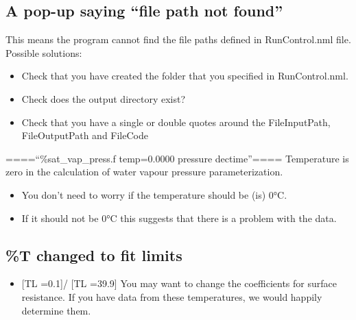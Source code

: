 \documentclass[letterpaper,10pt,english]{sphinxmanual}
\begin{document}
\subsection{A pop-up saying “file path not found”}
\label{\detokenize{troubleshooting:a-pop-up-saying-file-path-not-found}}
This means the program cannot find the file paths defined in
RunControl.nml file. Possible solutions:
\begin{itemize}
\item {} 
Check that you have created the folder that you specified in
RunControl.nml.

\item {} 
Check does the output directory exist?

\item {} 
Check that you have a single or double quotes around the
FileInputPath, FileOutputPath and FileCode

\end{itemize}

====“\%sat\_vap\_press.f temp=0.0000 pressure dectime”==== Temperature is
zero in the calculation of water vapour pressure parameterization.
\begin{itemize}
\item {} 
You don’t need to worry if the temperature should be (is) 0°C.

\item {} 
If it should not be 0°C this suggests that there is a problem with
the data.

\end{itemize}


\subsection{\%T changed to fit limits}
\label{\detokenize{troubleshooting:t-changed-to-fit-limits}}\begin{itemize}
\item {} 
{[}TL =0.1{]}/ {[}TL =39.9{]} You may want to change the coefficients for
surface resistance. If you have data from these temperatures, we
would happily determine them.

\end{itemize}
\end{document}
